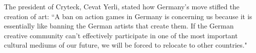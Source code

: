 
The president of Cryteck, Cevat Yerli, stated how Germany's move stifled the creation of art: ``A ban on action games in Germany is concerning us because it is essentially like banning the German artists that create them. If the German creative community can't effectively participate in one of the most important cultural mediums of our future, we will be forced to relocate to other countries."